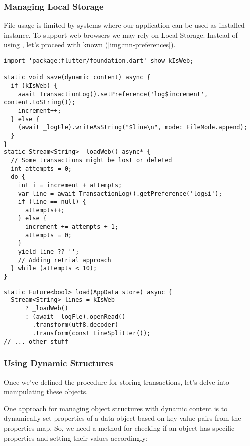 \subsubsection{Managing Local Storage}

File usage is limited by systems where our application can be used as installed instance. To support web browsers
we may rely on Local Storage. Instead of using , let's proceed with known  
(\cref{img:mn-preferences}).

\begin{lstlisting}
import 'package:flutter/foundation.dart' show kIsWeb;

static void save(dynamic content) async {
  if (kIsWeb) {
    await TransactionLog().setPreference('log$increment', content.toString());
    increment++;
  } else {
    (await _logFle).writeAsString("$line\n", mode: FileMode.append);
  }
}
static Stream<String> _loadWeb() async* {
  // Some transactions might be lost or deleted
  int attempts = 0;
  do {
    int i = increment + attempts;
    var line = await TransactionLog().getPreference('log$i');
    if (line == null) {
      attempts++;
    } else {
      increment += attempts + 1;
      attempts = 0;
    }
    yield line ?? '';
    // Adding retrial approach
  } while (attempts < 10);
}
\end{lstlisting}


\begin{lstlisting}[firstnumber=29]
static Future<bool> load(AppData store) async {
  Stream<String> lines = kIsWeb
      ? _loadWeb()
      : (await _logFle).openRead()
        .transform(utf8.decoder)
        .transform(const LineSplitter());
// ... other stuff
\end{lstlisting}


\subsubsection{Using Dynamic Structures}

Once we've defined the procedure for storing transactions, let's delve into manipulating these objects. 

One approach for managing object structures with dynamic content is to dynamically set properties of a data object 
based on key-value pairs from the properties map. So, we need a method for checking if an object has specific 
properties and setting their values accordingly:

